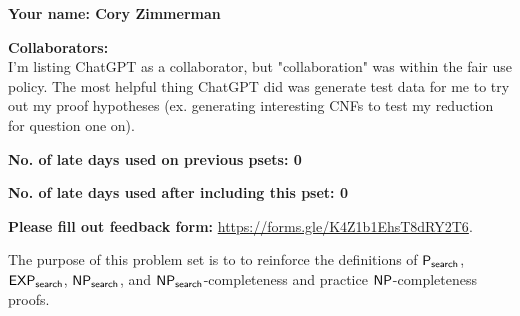 \documentclass[11pt]{article}
\begin{document}


\textbf{Your name: Cory Zimmerman}

\textbf{Collaborators:} \\
I'm listing ChatGPT as a collaborator, but "collaboration" was within the fair use policy. The most helpful thing ChatGPT did was generate test data for me to try out my proof hypotheses (ex. generating interesting CNFs to test my reduction for question one on).

\textbf{No. of late days used on previous psets: 0}

\textbf{No. of late days used after including this pset: 0}

\textbf{Please fill out feedback form:} \href{https://forms.gle/K4Z1b1EhsT8dRY2T6}{https://forms.gle/K4Z1b1EhsT8dRY2T6}.

\vspace{1em}

\noindent The purpose of this problem set is to to reinforce the definitions of $\mathsf{P_{search}}$, $\mathsf{EXP_{search}}$, $\mathsf{NP_{search}}$, and $\mathsf{NP_{search}}$-completeness and practice $\mathsf{NP}$-completeness proofs. 
\end{document}
